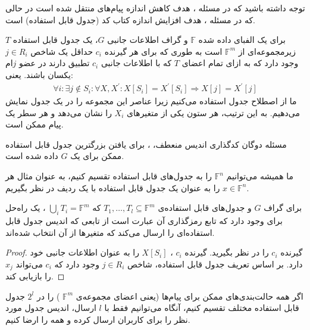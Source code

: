 \begin{observation}
توجه داشته باشید که در مسئله 
\picods،
هدف کاهش اندازه پیام‌های منتقل شده است در حالی که در مسئله 
\psicod
، هدف افزایش اندازه کتاب کد (جدول قابل استفاده) است.
\end{observation}

\begin{definition}
	\label{def1}
برای یک الفبای داده شده
 $\mathbb{F}$
  و گراف اطلاعات جانبی 
 $G$، 
 یک جدول قابل استفاده 
 $T$
  زیرمجموعه‌ای از 
 $\mathbb{F}^m$ 
 است به طوری که برای هر گیرنده 
 $c_i$
 حداقل یک شاخص 
  $j \in R_i$
  وجود دارد که به ازای تمام اعضای
  $T$
  که با اطلاعات جانبی
  $c_i$
  تطبیق دارند در عضو
  $j$ام
  یکسان باشند. یعنی:
\begin{align*}
    \forall i: \exists j \notin S_i: \forall X, X^\prime: X[S_i] = {X^\prime}[S_i]  \Rightarrow X[j] = {X^\prime}[j]
\end{align*}
ما از اصطلاح جدول استفاده می‌کنیم زیرا عناصر این مجموعه را در یک جدول نمایش می‌دهیم. به این ترتیب، هر ستون یکی از متغیرهای $X_i$ را نشان می‌دهد و هر سطر یک پیام ممکن است.
\end{definition}

مسئله دوگان کدگذاری اندیس منعطف، 
\psicod
، برای یافتن بزرگترین جدول قابل استفاده ممکن برای یک $G$ داده شده است.

\begin{remark}
    ما همیشه می‌توانیم
     $\mathbb{F}^n$ 
     را به جدول‌های قابل استفاده تقسیم کنیم، به عنوان مثال هر 
     $x \in \mathbb{F}^n$ 
     را به عنوان یک جدول قابل استفاده با یک ردیف در نظر بگیریم.
\end{remark}

\begin{lemma}
    برای گراف $G$ و جدول‌های قابل استفاده‌ی
    $T_1, \ldots, T_l \subseteq \mathbb{F}^m$
     که
     $\bigcup\limits_{i} T_i =  \mathbb{F}^m$
     ، یک راه‌حل برای
     \picod
     وجود دارد که تابع رمزگذاری آن عبارت است از تابعی که اندیس جدول قابل استفاده‌ای را ارسال می‌کند که متغیرها از آن انتخاب شده‌اند.
\end{lemma}
\begin{proof}
    گیرنده $c_i$ را در نظر بگیرید. گیرنده 
    $c_i$
    ،
    $X[S_i]$
    را به عنوان اطلاعات جانبی خود دارد. بر اساس تعریف جدول قابل استفاده، شاخص 
    $j \in R_i$
     وجود دارد که
      $c_i$ 
      می‌تواند
      $x_j$
      را بازیابی کند.
\end{proof}

\begin{corollary}
	\label{cor1}
اگر همه حالت‌بندی‌های ممکن برای پیام‌ها (یعنی اعضای مجموعه‌ی
$\mathbb{F}^m$
) را در 
$2^l$ 
جدول قابل استفاده مختلف تقسیم کنیم، آنگاه می‌توانیم فقط با
$l$ 
ارسال، اندیس جدول مورد نظر را برای کاربران ارسال کرده و همه را ارضا کنیم.
\end{corollary}

